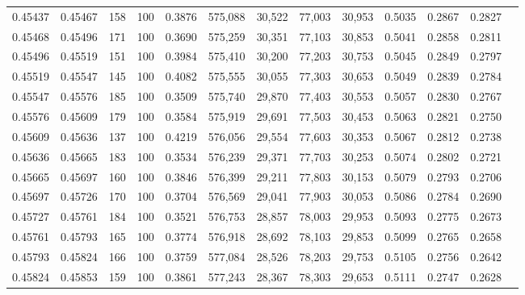 \begin{tabular}{rrrrrrrrrrrrr}
0.45437 & 0.45467 &    158 & 100 &                                     0.3876 & 575,088 &  30,522 &  77,003 &  30,953 & 0.5035 & 0.2867 & 0.2827 \\
0.45468 & 0.45496 &    171 & 100 &                                     0.3690 & 575,259 &  30,351 &  77,103 &  30,853 & 0.5041 & 0.2858 & 0.2811 \\
0.45496 & 0.45519 &    151 & 100 &                                     0.3984 & 575,410 &  30,200 &  77,203 &  30,753 & 0.5045 & 0.2849 & 0.2797 \\
0.45519 & 0.45547 &    145 & 100 &                                     0.4082 & 575,555 &  30,055 &  77,303 &  30,653 & 0.5049 & 0.2839 & 0.2784 \\
0.45547 & 0.45576 &    185 & 100 &                                     0.3509 & 575,740 &  29,870 &  77,403 &  30,553 & 0.5057 & 0.2830 & 0.2767 \\
0.45576 & 0.45609 &    179 & 100 &                                     0.3584 & 575,919 &  29,691 &  77,503 &  30,453 & 0.5063 & 0.2821 & 0.2750 \\
0.45609 & 0.45636 &    137 & 100 &                                     0.4219 & 576,056 &  29,554 &  77,603 &  30,353 & 0.5067 & 0.2812 & 0.2738 \\
0.45636 & 0.45665 &    183 & 100 &                                     0.3534 & 576,239 &  29,371 &  77,703 &  30,253 & 0.5074 & 0.2802 & 0.2721 \\
0.45665 & 0.45697 &    160 & 100 &                                     0.3846 & 576,399 &  29,211 &  77,803 &  30,153 & 0.5079 & 0.2793 & 0.2706 \\
0.45697 & 0.45726 &    170 & 100 &                                     0.3704 & 576,569 &  29,041 &  77,903 &  30,053 & 0.5086 & 0.2784 & 0.2690 \\
0.45727 & 0.45761 &    184 & 100 &                                     0.3521 & 576,753 &  28,857 &  78,003 &  29,953 & 0.5093 & 0.2775 & 0.2673 \\
0.45761 & 0.45793 &    165 & 100 &                                     0.3774 & 576,918 &  28,692 &  78,103 &  29,853 & 0.5099 & 0.2765 & 0.2658 \\
0.45793 & 0.45824 &    166 & 100 &                                     0.3759 & 577,084 &  28,526 &  78,203 &  29,753 & 0.5105 & 0.2756 & 0.2642 \\
0.45824 & 0.45853 &    159 & 100 &                                     0.3861 & 577,243 &  28,367 &  78,303 &  29,653 & 0.5111 & 0.2747 & 0.2628 \\

\end{tabular}
